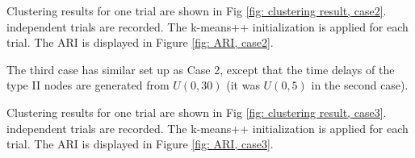 \noindent
Clustering results for one trial are shown in Fig \ref{fig: clustering result, case2}.
\\


 independent trials are recorded. 
The k-means++ initialization is applied for each trial.
The ARI is displayed in Figure \ref{fig: ARI, case2}.



The third case has similar set up as Case 2, except that 
the time delays of the type II nodes are generated from $U(0,30)$ (it was $U(0,5)$ in the second case).

\noindent
Clustering results for one trial are shown in Fig \ref{fig: clustering result, case3}.
\\


 independent trials are recorded. 
The k-means++ initialization is applied for each trial.
The ARI is displayed in Figure \ref{fig: ARI, case3}.




